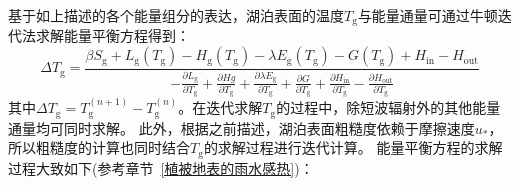 基于如上描述的各个能量组分的表达，湖泊表面的温度$T_{\mathrm {g}} $与能量通量可通过牛顿迭代法求解能量平衡方程得到：
\begin{equation}
  \Delta T_{\mathrm{g}}=\frac{\beta S_{\mathrm{g}}+L_{\mathrm{g}}\left(T_{\mathrm{g}}\right)-H_{\mathrm{g}}\left(T_{\mathrm{g}}\right)
  -\lambda E_{\mathrm{g}}\left(T_{\mathrm{g}}\right)-G\left(T_{\mathrm{g}}\right)+H_{\mathrm{in}}-H_{\mathrm{out}}}{-\frac{\partial L_{\mathrm{g}}}{\partial T_{\mathrm{g}}}
  +\frac{\partial H g}{\partial T_{\mathrm{g}}}+\frac{\partial \lambda E_{\mathrm{g}}}{\partial T_{\mathrm{g}}}+\frac{\partial G}{\partial T_{\mathrm{g}}}+\frac{\partial H_{\mathrm{in}}}{\partial T_{\mathrm{g}}}-\frac{\partial H_{\mathrm{out}}}{\partial T_{\mathrm{g}}}}
\end{equation}
其中$\Delta T_{\mathrm {g}} =T_{\mathrm {g}} ^{\left(n+1\right)}-T_{\mathrm {g}} ^{\left(n\right)}$。在迭代求解$T_{\mathrm {g}} $的过程中，除短波辐射外的其他能量通量均可同时求解。
此外，根据之前描述，湖泊表面粗糙度依赖于摩擦速度$u_\ast$，所以粗糙度的计算也同时结合$T_{\mathrm {g}} $的求解过程进行迭代计算。
能量平衡方程的求解过程大致如下(参考章节~\ref{植被地表的雨水感热})：

